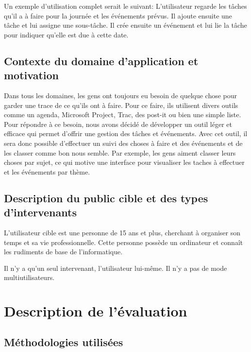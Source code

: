 \documentclass[letterpaper, oneside, 12pt,these,creativecommons]{thETS}
\begin{document}
Un exemple d’utilisation complet serait le suivant:
L’utilisateur regarde les tâches qu’il a à faire pour la journée et les événements prévus. Il ajoute ensuite une tâche et lui assigne une sous-tâche. Il crée ensuite un événement et lui lie la tâche pour indiquer qu’elle est due à cette date.

\section{Contexte du domaine d’application et motivation}

Dans tous les domaines, les gens ont toujours eu besoin de quelque chose pour garder une trace de ce qu'ils ont à faire. Pour ce faire, ils utilisent divers outils comme un agenda, Microsoft Project, Trac, des post-it ou bien une simple liste. Pour répondre à ce besoin, nous avons décidé de développer un outil léger et efficace qui permet d'offrir une gestion des tâches et événements. Avec cet outil, il sera donc possible d'effectuer un suivi des choses à faire et des événements et de les classer comme bon nous semble. Par exemple, les gens aiment classer leurs choses par sujet, ce qui motive une interface pour visualiser les taches à effectuer et les événements par thème.

\section{Description du public cible et des types d’intervenants}

L'utilisateur cible est une personne de 15 ans et plus, cherchant à organiser son temps et sa vie professionnelle. Cette personne possède un ordinateur et connaît les rudiments de base de l’informatique.

Il n’y a qu’un seul intervenant, l’utilisateur lui-même. Il n’y a pas de mode multiutilisateurs.

\chapter{Description de l'évaluation}

\section{Méthodologies utilisées}
\end{document}

